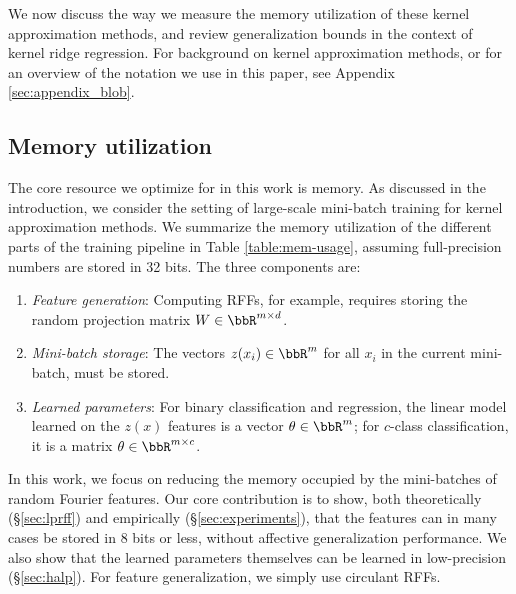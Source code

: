 We now discuss the way we measure the memory utilization of these kernel approximation methods, and review generalization bounds in the context of kernel ridge regression.  For background on kernel approximation methods, or for an overview of the notation we use in this paper, see Appendix \ref{sec:appendix_blob}.

\subsection{Memory utilization}
\label{subsec:memory_utils}
The core resource we optimize for in this work is memory.  As discussed in the introduction, we consider the setting of large-scale mini-batch training for kernel approximation methods. We summarize the memory utilization of the different parts of the training pipeline in Table \ref{table:mem-usage}, assuming full-precision numbers are stored in 32 bits. The three components are:
\begin{enumerate}
	\item \textit{Feature generation}: Computing RFFs, for example, requires storing the random projection matrix $W \in \RR^{m\times d}$.
	\item \textit{Mini-batch storage}: The vectors $z(x_i)\in\RR^m$ for all $x_i$ in the current mini-batch, must be stored.
	\item \textit{Learned parameters}: For binary classification and regression, the linear model learned on the $z(x)$ features is a vector $\theta \in \RR^m$; for $c$-class classification, it is a matrix $\theta \in \RR^{m\times c}$.	
\end{enumerate}

In this work, we focus on reducing the memory occupied by the mini-batches of random Fourier features. Our core contribution is to show, both theoretically (\S\ref{sec:lprff}) and empirically (\S\ref{sec:experiments}), that the features can in many cases be stored in 8 bits or less, without affective generalization performance.  We also show that the learned parameters themselves can be learned in low-precision (\S\ref{sec:halp}).  For feature generalization, we simply use circulant RFFs\cite{yu15}.

